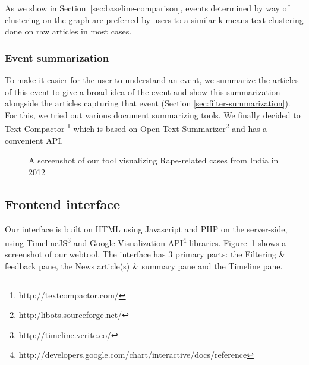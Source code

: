 As we show in Section~\ref{sec:baseline-comparison}, events determined by way of clustering on the graph are preferred by users to a similar k-means text clustering done on raw articles in most cases.

\subsubsection*{Event summarization}
To make it easier for the user to understand an event, we summarize the articles of this event to give a broad idea of the event and show this summarization alongside the articles capturing that event (Section \ref{sec:filter-summarization}). For this, we tried out various document summarizing tools. We finally decided to Text Compactor \footnote{http://textcompactor.com/} which is based on Open Text Summarizer\footnote{http:/libots.sourceforge.net/} and has a convenient API. 
\begin{figure}[ht]
\caption{A screenshot of our tool visualizing Rape-related cases from India in 2012}
\label{fig:complete-tool-screenshot}
\end{figure}
\subsection {Frontend interface}
Our interface is built on HTML using Javascript and PHP on the server-side, using TimelineJS\footnote{http://timeline.verite.co/} and Google Visualization API\footnote{http://developers.google.com/chart/interactive/docs/reference} libraries.
Figure~\ref{fig:complete-tool-screenshot} shows a screenshot of our webtool. The interface
has 3 primary parts: the Filtering \& feedback pane, the News article(s) \& summary pane and the Timeline pane. 
